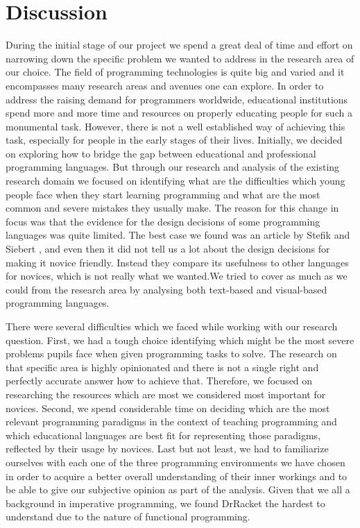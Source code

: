 \chapter{Discussion}
\label{chap:discussion}

During the initial stage of our project we spend a great deal of time and effort on narrowing down the specific problem we wanted to address in the research area of our choice. The field of programming technologies is quite big and varied and it encompasses many research areas and avenues one can explore. In order to address  the raising demand for programmers worldwide, educational institutions spend more and more time and resources on properly educating people for such a monumental task. However, there is not a well established way of achieving this task, especially for people in the early stages of their lives. Initially, we decided on exploring how to bridge the gap between educational and professional programming languages. But through our research and analysis of the existing research domain we  focused on identifying what are the difficulties which young people face when they start learning programming and what are the most common and severe mistakes they usually make. The reason for this change in focus was that the evidence for the design decisions of some programming languages was quite limited. The best case we found was an article by Stefik and Siebert \cite{QuorumRandomoPerl}, and even then it did not tell us a lot about the design decisions for making it novice friendly. Instead they compare its usefulness to other languages for novices, which is not really what we wanted.We tried to cover as much as we could from the research area by analysing both text-based and visual-based programming languages. 

There were several difficulties which we faced while working with our research question. First, we had a tough choice identifying which might be the most severe problems pupils face when given programming tasks to solve. The research on that specific area is highly opinionated and there is not a single right and perfectly accurate answer how to achieve that. Therefore, we focused on researching the resources which are most we considered most important for novices. Second, we spend considerable time on deciding which are the most relevant programming paradigms in the context of teaching programming and which educational languages are best fit for representing those paradigms, reflected by their usage by novices. Last but not least, we had to familiarize ourselves with each one of the three programming environments we have chosen in order to acquire a better overall understanding of their inner workings and to be able to give our subjective opinion as part of the analysis. Given that we all a background in imperative programming, we found DrRacket the hardest to understand due to the nature of functional programming.

